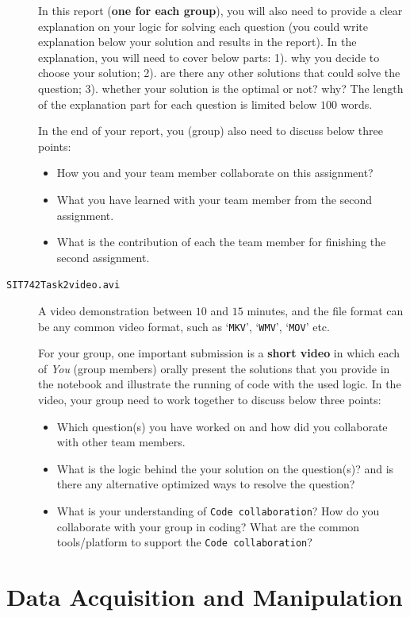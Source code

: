 \documentclass[a4paper]{article}
\begin{document}
\begin{description}
In this report (\textbf{one for each group}), 
you will also need to provide a clear explanation on your logic for solving each question (you could write explanation below your solution and results in the report).
In the explanation, you will need to cover below parts:
1). why you decide to choose your solution;
2). are there any other solutions that could solve the question;
3). whether your solution is the optimal or not? why?
The length of the explanation part for each question is limited below $100$ words.

In the end of your report, 
you (group) also need to discuss below three points:
\begin{itemize}
    \item How you and your team member collaborate on this assignment? 
    \item What you have learned with your team member from the second assignment.
    \item What is the contribution of each the team member for finishing the second assignment.
\end{itemize}

\item[\texttt{SIT742Task2video.avi}] 
A video demonstration between $10$ and $15$ minutes,
and the file format can be any common video format,
such as `\texttt{MKV}', `\texttt{WMV}', `\texttt{MOV}' etc. 

For your group,
one important submission is a \textbf{short video} 
in which each of \emph{You} (group members) orally present the solutions 
that you provide in the notebook 
and illustrate the running of code with the used logic.
In the video, 
your group need to work together to discuss below three points:
\begin{itemize}
    \item Which question(s) you have worked on and how did you collaborate with other team members.
    \item What is the logic behind the your solution on the question(s)? and is there any alternative optimized ways to resolve the question?
    \item What is your understanding of \texttt{Code collaboration}? How do you collaborate with your group in coding? What are the common tools/platform to support the \texttt{Code collaboration}?
\end{itemize}
\end{description}


     
    \part{Data Acquisition and Manipulation}\label{sec:part1}
\end{document}
